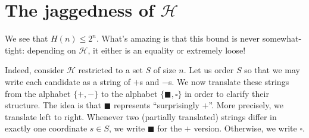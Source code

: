 \documentclass[openany, notitlepage, justified]{tufte-book}
\newcommand{\Hh}{\mathcal{H}}
\begin{document}
        \section{The jaggedness of $\Hh$}

            We see that $H(n) \leq 2^n$.  What's amazing is that this bound is
            never somewhat-tight: depending on $\Hh$, it either is an equality
            or extremely loose!

            Indeed, consider $\Hh$ restricted to a set $S$ of size $n$.  Let us
            order $S$ so that we may write each candidate as a string of $+$s
            and $-$s.  We now translate these strings from the alphabet
            $\{+,-\}$ to the alphabet $\{\blacksquare,\square\}$ in order to
            clarify their structure.
            The idea is that $\blacksquare$ represents ``surprisingly $+$''.
            More precisely, we translate left to right.  Whenever two
            (partially translated) strings differ in exactly one coordinate
            $s\in S$, we write $\blacksquare$ for the $+$ version.  Otherwise,
            we write $\square$.
\end{document}
